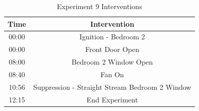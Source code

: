 \documentclass{article}
\begin{document}
\begin{table}[H]
	\centering
	\caption{Experiment 9 Interventions}
	\begin{tabular}{|c|c|} 
		\hline
		Time & Intervention \\ \hline \hline
		00:00 & Ignition - Bedroom 2 \\ \hline
		00:00 & Front Door Open \\ \hline
		08:00 & Bedroom 2 Window Open\\ \hline
		08:40 & Fan On\\ \hline
		10:56 & Suppression - Straight Stream Bedroom 2 Window\\ \hline
		12:15 & End Experiment\\ \hline
	\end{tabular}
	\label{Table:Exp9Interventions}
\end{table}

\clearpage
\end{document}
